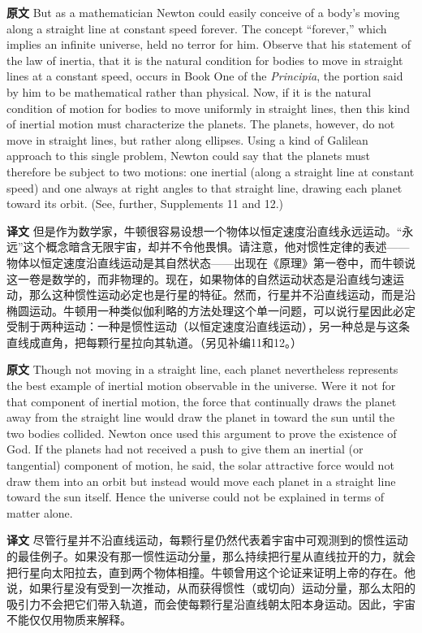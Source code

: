 \documentclass[UTF8,zihao=-4]{ctexart}
\begin{document}
\noindent\textbf{原文} But as a mathematician Newton could easily conceive of a body's moving along a straight line at constant speed forever. The concept ``forever,'' which implies an infinite universe, held no terror for him. Observe that his statement of the law of inertia, that it is the natural condition for bodies to move in straight lines at a constant speed, occurs in Book One of the \emph{Principia}, the portion said by him to be mathematical rather than physical. Now, if it is the natural condition of motion for bodies to move uniformly in straight lines, then this kind of inertial motion must characterize the planets. The planets, however, do not move in straight lines, but rather along ellipses. Using a kind of Galilean approach to this single problem, Newton could say that the planets must therefore be subject to two motions: one inertial (along a straight line at constant speed) and one always at right angles to that straight line, drawing each planet toward its orbit. (See, further, Supplements 11 and 12.)
\par\noindent\textbf{译文} 但是作为数学家，牛顿很容易设想一个物体以恒定速度沿直线永远运动。“永远”这个概念暗含无限宇宙，却并不令他畏惧。请注意，他对惯性定律的表述——物体以恒定速度沿直线运动是其自然状态——出现在《原理》第一卷中，而牛顿说这一卷是数学的，而非物理的。现在，如果物体的自然运动状态是沿直线匀速运动，那么这种惯性运动必定也是行星的特征。然而，行星并不沿直线运动，而是沿椭圆运动。牛顿用一种类似伽利略的方法处理这个单一问题，可以说行星因此必定受制于两种运动：一种是惯性运动（以恒定速度沿直线运动），另一种总是与这条直线成直角，把每颗行星拉向其轨道。（另见补编11和12。）
\medskip

\noindent\textbf{原文} Though not moving in a straight line, each planet nevertheless represents the best example of inertial motion observable in the universe. Were it not for that component of inertial motion, the force that continually draws the planet away from the straight line would draw the planet in toward the sun until the two bodies collided. Newton once used this argument to prove the existence of God. If the planets had not received a push to give them an inertial (or tangential) component of motion, he said, the solar attractive force would not draw them into an orbit but instead would move each planet in a straight line toward the sun itself. Hence the universe could not be explained in terms of matter alone.
\par\noindent\textbf{译文} 尽管行星并不沿直线运动，每颗行星仍然代表着宇宙中可观测到的惯性运动的最佳例子。如果没有那一惯性运动分量，那么持续把行星从直线拉开的力，就会把行星向太阳拉去，直到两个物体相撞。牛顿曾用这个论证来证明上帝的存在。他说，如果行星没有受到一次推动，从而获得惯性（或切向）运动分量，那么太阳的吸引力不会把它们带入轨道，而会使每颗行星沿直线朝太阳本身运动。因此，宇宙不能仅仅用物质来解释。
\medskip
\end{document}
